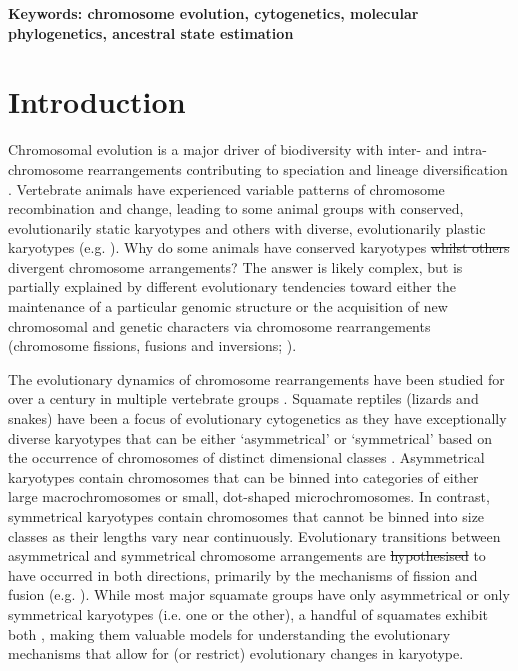 \documentclass[a4paper, 12pt]{article}
\providecommand{\DIFadd}[1]{{\protect\color{blue}\uwave{#1}}} %
\providecommand{\DIFdel}[1]{{\protect\color{red}\sout{#1}}}                      %
\providecommand{\DIFaddbegin}{} %
\providecommand{\DIFaddend}{} %
\providecommand{\DIFdelbegin}{} %
\providecommand{\DIFdelend}{} %
\newcommand{\DIFscaledelfig}{0.5}
\newlength{\DIFdelgraphicswidth} %
\newlength{\DIFdelgraphicsheight} %
\newcommand{\DIFaddincludegraphics}[2][]{{\color{blue}\fbox{\DIFOincludegraphics[#1]{#2}}}} %
\newcommand{\DIFdelincludegraphics}[2][]{%
\sbox{\DIFdelgraphicsbox}{\DIFOincludegraphics[#1]{#2}}%
\settoboxwidth{\DIFdelgraphicswidth}{\DIFdelgraphicsbox} %
\settoboxtotalheight{\DIFdelgraphicsheight}{\DIFdelgraphicsbox} %
\scalebox{\DIFscaledelfig}{%
\parbox[b]{\DIFdelgraphicswidth}{\usebox{\DIFdelgraphicsbox}\\[-\baselineskip] \rule{\DIFdelgraphicswidth}{0em}}\llap{\resizebox{\DIFdelgraphicswidth}{\DIFdelgraphicsheight}{%
\setlength{\unitlength}{\DIFdelgraphicswidth}%
\begin{picture}(1,1)%
\thicklines\linethickness{2pt} %
{\color[rgb]{1,0,0}\put(0,0){\framebox(1,1){}}}%
{\color[rgb]{1,0,0}\put(0,0){\line( 1,1){1}}}%
{\color[rgb]{1,0,0}\put(0,1){\line(1,-1){1}}}%
\end{picture}%
}\hspace*{3pt}}} %
} %
\DeclareRobustCommand{\DIFaddbegin}{\DIFOaddbegin \let\includegraphics\DIFaddincludegraphics} %
\DeclareRobustCommand{\DIFaddend}{\DIFOaddend \let\includegraphics\DIFOincludegraphics} %
\DeclareRobustCommand{\DIFdelbegin}{\DIFOdelbegin \let\includegraphics\DIFdelincludegraphics} %
\DeclareRobustCommand{\DIFdelend}{\DIFOaddend \let\includegraphics\DIFOincludegraphics} %
\begin{document}
\textbf{Keywords: chromosome evolution, cytogenetics, molecular phylogenetics, ancestral state estimation}


\section{Introduction}\label{main}

Chromosomal evolution is a major driver of biodiversity with inter- and intra-chromosome rearrangements contributing to speciation and lineage diversification \citep{pellestor2020chromoanagenesis}. 
Vertebrate animals have experienced variable patterns of chromosome recombination and change, leading to some animal groups with conserved, evolutionarily static karyotypes and others with diverse, evolutionarily plastic karyotypes (e.g. \citealt{graphodatsky2011genome,neto2011extensive,mezzasalma2019changes,degrandi2020distribution,mayrose2021evolution}).
Why do some animals have conserved karyotypes \DIFdelbegin \DIFdel{whilst others }\DIFdelend \DIFaddbegin \DIFadd{whereas others have }\DIFaddend divergent chromosome arrangements? 
The answer is likely complex, but is partially explained by different evolutionary tendencies toward either the maintenance of a particular genomic structure or the acquisition of new chromosomal and genetic characters via chromosome rearrangements (chromosome fissions, fusions and inversions; \citealt{crombach2007chromosome,amorim2021new}).

The evolutionary dynamics of chromosome rearrangements have been studied for over a century in multiple vertebrate groups \citep{damas2021vertebrate}. 
Squamate reptiles (lizards and snakes) have been a focus of evolutionary cytogenetics as they have exceptionally diverse karyotypes that can be either ‘asymmetrical’ or ‘symmetrical’ based on the occurrence of chromosomes of distinct dimensional classes \citep{stebbins1950chapter,white1973}. 
Asymmetrical karyotypes contain chromosomes that can be binned into categories of either large macrochromosomes or small, dot-shaped microchromosomes.
In contrast, symmetrical karyotypes contain chromosomes that cannot be binned into size classes as their lengths vary near continuously. 
Evolutionary transitions between asymmetrical and symmetrical chromosome arrangements are \DIFdelbegin \DIFdel{hypothesised }\DIFdelend \DIFaddbegin \DIFadd{hypothesized }\DIFaddend to have occurred in both directions, primarily by the mechanisms of fission and fusion (e.g. \citealt{olmo2008trends,srikulnath2015karyotype}). 
While most major squamate groups have only asymmetrical or only symmetrical karyotypes (i.e. one or the other), a handful of squamates exhibit both \citep{mezzasalma2021lizards}, making them valuable models for understanding the evolutionary mechanisms that allow for (or restrict) evolutionary changes in karyotype.    
\end{document}
